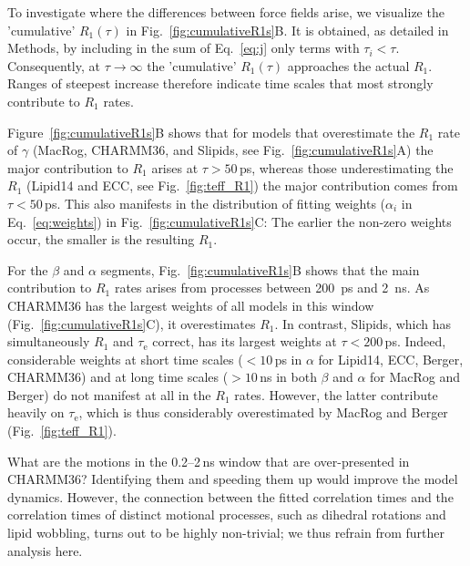 \documentclass[journal=jcisd8,manuscript=article,layout=twocolumn]{achemso}
\begin{document}
To investigate where the differences between force fields arise, we visualize the 
'cumulative' $R_1(\tau)$ in Fig.~\ref{fig:cumulativeR1s}B.
It is obtained, as detailed in Methods,
by including in the sum of Eq.~\eqref{eq:j} only terms with $\tau_i<\tau$.
Consequently, at $\tau\to\infty$ the 'cumulative' $R_1(\tau)$ approaches the actual $R_1$. Ranges of steepest increase therefore indicate time scales that most strongly contribute to $R_1$ rates.

Figure~\ref{fig:cumulativeR1s}B shows
that for models that overestimate the $R_1$ rate of $\gamma$
(MacRog, CHARMM36, and Slipids, see Fig.~\ref{fig:cumulativeR1s}A)
the major contribution to $R_1$ arises at $\tau>50$\,ps, whereas those underestimating the $R_1$ 
(Lipid14 and ECC, see Fig.~\ref{fig:teff_R1})
the major contribution comes from $\tau<50$\,ps. 
%
This also manifests in the
distribution of fitting weights ($\alpha_i$ in Eq.~\eqref{eq:weights}) in Fig.~\ref{fig:cumulativeR1s}C:
The earlier the non-zero weights occur, the smaller is the resulting $R_1$.


For the $\beta$ and $\alpha$ segments, Fig.~\ref{fig:cumulativeR1s}B shows
that the main contribution to $R_1$ rates arises from processes
between 200~ps and 2~ns.
%
As CHARMM36 has the largest weights of all models in this window (Fig.~\ref{fig:cumulativeR1s}C),
it overestimates $R_1$.
%
In contrast, Slipids, which has simultaneously $R_1$ and $\tau_\mathrm e$ correct,
has its largest weights at $\tau<200$\,ps.
%
Indeed, considerable weights
at short time scales ($<10$\,ps in $\alpha$ for Lipid14, ECC, Berger, CHARMM36) and
at long time scales ($>10$\,ns in both $\beta$ and $\alpha$ for MacRog and Berger)
do not manifest at all in the $R_1$ rates.
%
However, the latter contribute heavily on $\tau_\mathrm e$,
which is thus considerably overestimated by MacRog and Berger (Fig.~\ref{fig:teff_R1}).

What are the motions in the 0.2--2\,ns window that are over-presented in CHARMM36?
Identifying them and speeding them up would improve the model dynamics.
However, the connection between the fitted correlation times and the correlation times of distinct motional processes, such as dihedral rotations and lipid wobbling, turns out to be highly non-trivial; we thus refrain from further analysis here.
\end{document}
